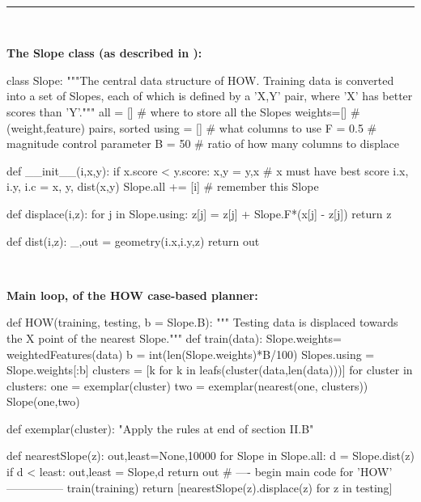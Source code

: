 

\begin{figure*} 
~\hrule~
\begin{minipage}[t]{.45\linewidth}
\scriptsize\vspace{1mm}
{\bf The Slope class (as described in ):}

 
\begin{python}[left]
class Slope:
  """The central data structure of HOW. Training data 
  is converted into a set of Slopes, each of which is 
  defined by a 'X,Y' pair, where 'X'
  has better scores than 'Y'."""
  all   = []    # where to store all the Slopes
  weights=[]    # (weight,feature) pairs, sorted
  using = []    # what columns to use
  F     = 0.5   # magnitude control parameter
  B     = 50    # ratio of how many columns to displace

  def __init__(i,x,y):
    if x.score < y.score:
      x,y = y,x      # x must have best score
    i.x, i.y, i.c = x, y, dist(x,y) 
    Slope.all += [i]  # remember this Slope

  def displace(i,z):
    for j in Slope.using:
      z[j] = z[j] + Slope.F*(x[j] - z[j])
    return z

  def dist(i,z):
    _,out = geometry(i.x,i.y,z)
    return out
\end{python}

~~

{\bf Main loop, of the  HOW  case-based planner:}

\begin{python}[left]
def HOW(training, testing, b = Slope.B):
  """ Testing data is displaced towards
  the X point of the nearest Slope."""
  def train(data):
    Slope.weights= weightedFeatures(data)
    b           = int(len(Slope.weights)*B/100)
    Slopes.using = Slope.weights[:b]
    clusters    = [k for k in 
                   leafs(cluster(data,len(data)))]
    for cluster in clusters:
      one = exemplar(cluster)
      two = exemplar(nearest(one, clusters))
      Slope(one,two)
 
  def exemplar(cluster):
    "Apply the rules at end of section II.B"
 
  def nearestSlope(z):
    out,least=None,10000
    for Slope in Slope.all:
      d = Slope.dist(z)
      if d < least: out,least = Slope,d
    return out
  # ---- begin main code for  'HOW' ---------------
  train(training)
  return [nearestSlope(z).displace(z) for z in testing]
\end{python}


\end{minipage}
\end{figure*}
